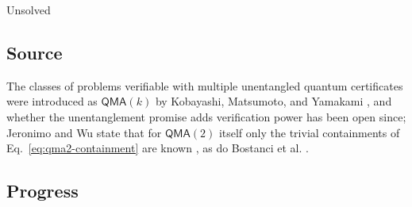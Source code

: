 Unsolved

\subsection*{Source}

The classes of problems verifiable with multiple unentangled quantum
certificates were introduced as $\mathsf{QMA}(k)$ by Kobayashi, Matsumoto,
and Yamakami , and whether the
unentanglement promise adds verification power has been open since; Jeronimo
and Wu state that for $\mathsf{QMA}(2)$ itself only the trivial containments
of Eq.~\eqref{eq:qma2-containment} are known
, as do Bostanci et al.
.

\subsection*{Progress}

